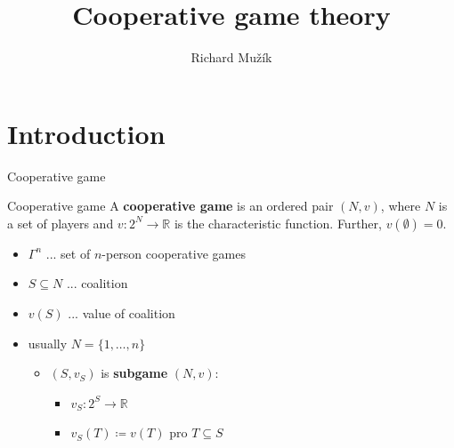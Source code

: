 \documentclass{beamer}
\title{Cooperative game theory}
\author{Richard Mužík}
\institute{richard@imuzik.cz}
\begin{document}

\begin{frame}
	\maketitle %
\end{frame}

\section{Introduction} %


\begin{frame}{Cooperative game}
    \begin{block}{Cooperative game}
		\pause
        A \textbf{cooperative game} is an ordered pair $(N,v)$, where $N$ is a set of players and $v\colon 2^N \to \mathbb{R}$ is the characteristic function. Further, $v(\emptyset) = 0$.
    \end{block}
    \begin{itemize}
        \item<5-> $\Gamma^n$ ... set of $n$-person cooperative games
        \item<3-> $S \subseteq N$ ... coalition
        \item<4-> $v(S)$ ... value of coalition
        \item<6-> usually $N = \{1,\dots,n\}$
        \begin{itemize}
            \item<7-> $(S,v_S)$ is \textbf{subgame} $(N,v)$:
            \begin{itemize}
                \item<7-> $v_S \colon 2^S \to \mathbb{R}$
                \item<7-> $v_S(T) \coloneqq v(T)$ pro $T \subseteq S$
            \end{itemize}
        \end{itemize}
    \end{itemize}
	
\end{frame}
\end{document}
